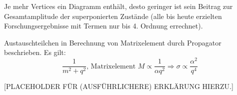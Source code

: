 \documentclass[Ex4_Zusammenfassung.tex]{subfiles}
\begin{document}
	Je mehr Vertices ein Diagramm enthält, desto geringer ist sein Beitrag zur Gesamtamplitude der superponierten Zustände (alle bis heute erzielten Forschungsergebnisse mit Termen nur bis 4. Ordnung errechnet).
	
	Austauschteilchen in Berechnung von Matrixelement durch Propagator beschrieben. Es gilt:
	\begin{equation}
		 \frac{1}{m^2 + q^2} \text{, Matrixelement } M \propto \frac{1}{\alpha q^2} \Rightarrow \sigma \propto \frac{\alpha^2}{q^4}
	\end{equation}
		
		[PLACEHOLDER FÜR (AUSFÜHRLICHERE) ERKLÄRUNG HIERZU.]
	
\end{document}
